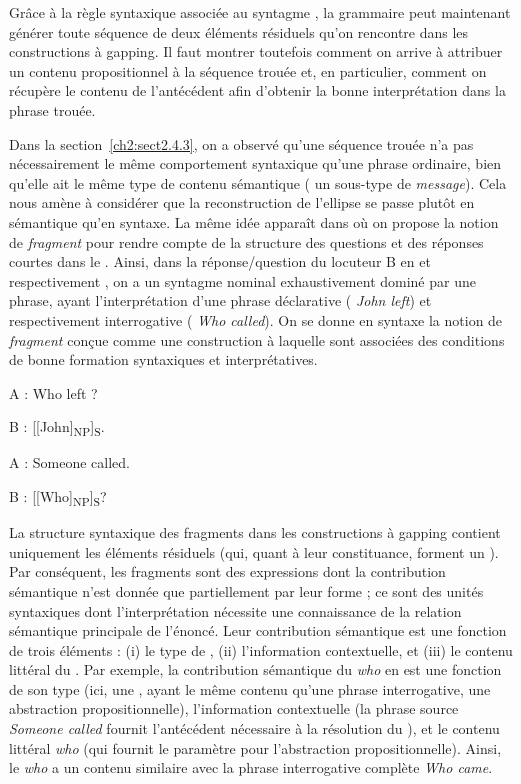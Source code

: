 Grâce à la règle syntaxique associée au syntagme  , la grammaire peut maintenant générer toute séquence de deux éléments résiduels qu’on rencontre dans les constructions à gapping. Il faut montrer toutefois comment on arrive à attribuer un contenu propositionnel à la séquence trouée et, en particulier, comment on récupère le contenu de l’antécédent afin d’obtenir la bonne interprétation dans la phrase trouée. 

Dans la section~\ref{ch2:sect2.4.3}, on a observé qu’une séquence trouée n’a pas nécessairement le même comportement syntaxique qu’une phrase ordinaire, bien qu’elle ait le même type de contenu sémantique ({\cad} un sous-type de \textit{message}). Cela nous amène à considérer que la reconstruction de l’ellipse se passe plutôt en sémantique qu’en syntaxe. La même idée apparaît dans \citet{GinzburgEtAl2000} où on propose la notion de \textit{fragment} pour rendre compte de la structure des questions et des réponses courtes dans le . Ainsi, dans la réponse/question du locuteur B en  et respectivement , on a un syntagme nominal exhaustivement dominé par une phrase, ayant l’interprétation d’une phrase déclarative ({{\cad}} \textit{John left}) et respectivement interrogative ({{\cad}} \textit{Who called}). On se donne en syntaxe la notion de \textit{fragment} conçue comme une construction à laquelle sont associées des conditions de bonne formation syntaxiques et interprétatives.

\ea \label{ch2:ex265}
A : Who left ? 

B : [[John]\textsubscript{NP}]\textsubscript{S}. 
\z

\ea \label{ch2:ex266}
A : Someone called. 

B : [[Who]\textsubscript{NP}]\textsubscript{S}?  
\z

La structure syntaxique des fragments dans les constructions à gapping con\-tient uniquement les éléments résiduels (qui, quant à leur constituance, forment un ). Par conséquent, les fragments sont des expressions dont la contribution sémantique n’est donnée que partiellement par leur forme ; ce sont des unités syntaxiques dont l’interprétation nécessite une connaissance de la relation sémantique principale de l’énoncé. Leur contribution sémantique est une fonction de trois éléments : (i) le type de , (ii) l’information contextuelle, et (iii) le contenu littéral du . Par exemple, la contribution sémantique du  \textit{who} en  est une fonction de son type (ici, une , ayant le même contenu qu’une phrase interrogative, {\cad} une abstraction propositionnelle), l’information contextuelle (la phrase source \textit{Someone called} fournit l’antécédent nécessaire à la résolution du ), et le contenu littéral \textit{who} (qui fournit le paramètre pour l’abstraction propositionnelle). Ainsi, le  \textit{who} a un contenu similaire avec la phrase interrogative complète \textit{Who came}.


